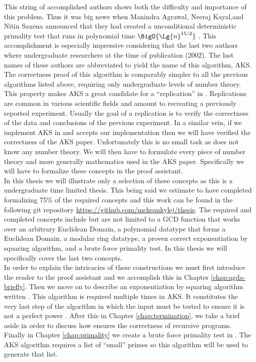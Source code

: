 \documentclass[./Thesis.tex]{subfiles}
\begin{document}
This string of accomplished authors shows both the difficulty and importance of this
problem. Thus it was big news when Manindra Agrawal, Neeraj Kayal,and Nitin
Saxena announced that they had created a unconditional deterministic
primality test that runs in polynomial time $\BigO{\Lg{n}^{15/2}}$ \cite{aks}.
This accomplishment is especially impressive considering that the last two
authors where undergraduate researchers at the time of publication (2002). The
last names of these authors are abbreviated to yield the name of this algorithm,
AKS. The correctness proof of this algorithm is comparably simpler to all the
previous algorithms listed above, requiring only undergraduate levels of number
theory. This property makes AKS a great candidate for a ``replication'' in
\Agda{}. Replications are common in various scientific fields and amount to
recreating a previously reported experiment. Usually the goal of a replication
is to verify the correctness of the data and conclusions of the previous
experiment. In a similar vein, if we implement AKS in \Agda{} and \Agda{}
accepts our implementation then we will have verified the correctness of the AKS
paper. Unfortunately this is no small task as \Agda{} does not know any number theory.
We will then have to formulate every piece of number theory and more generally
mathematics used in the AKS paper. Specifically we will have to formalize these
concepts in the \Agda{} proof assistant. \\

In this thesis we will illustrate only
a selection of these concepts as this is a undergraduate time limited thesis.
This being said we estimate to have completed formalizing 75\% of the required
concepts and this work can be found in the following git repository
\url{https://github.com/mckeankylej/thesis}. The required and completed concepts
include but are not limited to a GCD function that works over an arbitrary
Euclidean Domain, a polynomial datatype that forms a Euclidean Domain,
a modular ring datatype, a proven correct exponentiation by squaring algorithm,
and a brute force primality test. In this thesis we will specifically cover the
last two concepts. \\

In order to explain the intricacies of these constructions we must first
introduce the reader to the \Agda{} proof assistant and we accomplish this in
Chapter \ref{chap:agda-briefly}. Then we move on to describe an exponentiation
by squaring algorithm written \Agda{}. This algorithm is required multiple times
in AKS. It constitutes the very last step of the algorithm in which the input
must be tested to ensure it is not a perfect power \cite{smid}. After this in
Chapter \ref{chap:termination}, we take a brief aside in order to discuss how
\Agda{} ensures the correctness of recursive programs. Finally in Chapter
\ref{chap:primality} we create a brute force primality test in \Agda{}. The AKS
algorithm requires a list of ``small'' primes so this algorithm will be used to
generate that list.
\end{document}
